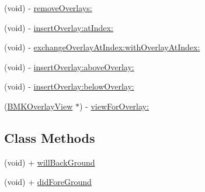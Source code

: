 \begin{DoxyCompactItemize}
\item 
(void) -\/ \hyperlink{interface_b_m_k_map_view_a3eb7909fb1adce117c1de432fd5d816a}{remove\+Overlays\+:}
\item 
(void) -\/ \hyperlink{interface_b_m_k_map_view_adc0775a2651c1e4099f93d9c1bbffe3d}{insert\+Overlay\+:at\+Index\+:}
\item 
(void) -\/ \hyperlink{interface_b_m_k_map_view_a62c1c29b8e5b408ba0c40411a3c1f50f}{exchange\+Overlay\+At\+Index\+:with\+Overlay\+At\+Index\+:}
\item 
(void) -\/ \hyperlink{interface_b_m_k_map_view_ad94b45c4df7978e3a6095918323496d3}{insert\+Overlay\+:above\+Overlay\+:}
\item 
(void) -\/ \hyperlink{interface_b_m_k_map_view_a73dfe9f74d722b7b1fc477e791f34653}{insert\+Overlay\+:below\+Overlay\+:}
\item 
(\hyperlink{interface_b_m_k_overlay_view}{B\+M\+K\+Overlay\+View} $\ast$) -\/ \hyperlink{interface_b_m_k_map_view_aa88093440ad22f7af9cf9a36051f662d}{view\+For\+Overlay\+:}
\end{DoxyCompactItemize}
\subsection*{Class Methods}
\begin{DoxyCompactItemize}
\item 
(void) + \hyperlink{interface_b_m_k_map_view_a2f7752221a3c2ba2682cddbcd351f0fc}{will\+Back\+Ground}
\item 
(void) + \hyperlink{interface_b_m_k_map_view_ae9e5519e547a14d2fc5479c28f724560}{did\+Fore\+Ground}
\end{DoxyCompactItemize}
